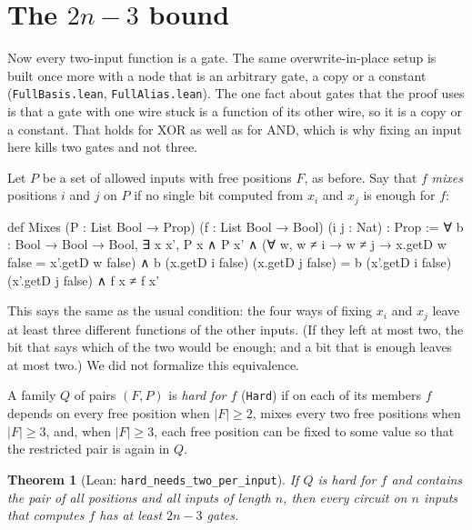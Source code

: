 \documentclass[11pt]{amsart}
\newtheorem{theorem}{Theorem}
\theoremstyle{definition}
\theoremstyle{remark}
\newcommand{\lean}[1]{\texttt{#1}}
\begin{document}
\section{The $2n-3$ bound}

Now every two-input function is a gate. The same overwrite-in-place setup is built once more
with a node that is an arbitrary gate, a copy or a constant (\lean{FullBasis.lean},
\lean{FullAlias.lean}). The one fact about gates that the proof uses is that a gate with one
wire stuck is a function of its other wire, so it is a copy or a constant. That holds for XOR
as well as for AND, which is why fixing an input here kills two gates and not three.

Let $P$ be a set of allowed inputs with free positions $F$, as before. Say that $f$
\emph{mixes} positions $i$ and $j$ on $P$ if no single bit computed from $x_i$ and $x_j$ is
enough for $f$:

\begin{leancode}
def Mixes (P : List Bool → Prop) (f : List Bool → Bool) (i j : Nat) : Prop :=
  ∀ b : Bool → Bool → Bool, ∃ x x', P x ∧ P x' ∧
    (∀ w, w ≠ i → w ≠ j → x.getD w false = x'.getD w false) ∧
    b (x.getD i false) (x.getD j false) = b (x'.getD i false) (x'.getD j false) ∧
    f x ≠ f x'
\end{leancode}

This says the same as the usual condition: the four ways of fixing $x_i$ and $x_j$ leave at
least three different functions of the other inputs. (If they left at most two, the bit that
says which of the two would be enough; and a bit that is enough leaves at most two.) We did not
formalize this equivalence.

A family $Q$ of pairs $(F,P)$ is \emph{hard for $f$} (\lean{Hard}) if on each of its members
$f$ depends on every free position when $|F|\ge 2$, mixes every two free positions when
$|F|\ge 3$, and, when $|F|\ge 3$, each free position can be fixed to some value so that the
restricted pair is again in $Q$.

\begin{theorem}[Lean: \lean{hard\_needs\_two\_per\_input}]\label{thm:hard}
If $Q$ is hard for $f$ and contains the pair of all positions and all inputs of length $n$,
then every circuit on $n$ inputs that computes $f$ has at least $2n-3$ gates.
\end{theorem}
\end{document}
